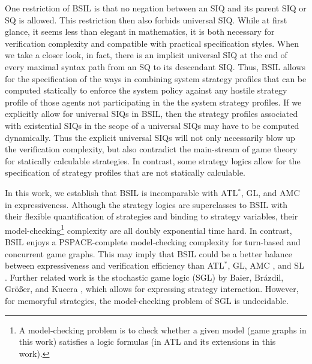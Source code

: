\documentclass[11pt]{article}
\begin{document}
\label{reply2.motive3} 
One restriction of BSIL is that no negation between an SIQ and its parent SIQ or SQ is allowed. 
This restriction then also forbids universal SIQ.  
While at first glance, it seems less than elegant in mathematics, 
it is both necessary for verification complexity and 
compatible with practical specification styles.  
When we take a closer look, in fact, there is an implicit universal SIQ 
at the end of every maximal syntax path from an SQ to its descendant SIQ.  
Thus, BSIL allows for the specification of the ways in combining system strategy profiles that 
can be computed statically to enforce the system policy against 
any hostile strategy profile of those agents not participating in the the system strategy 
profiles.  
If we explicitly allow for universal SIQs in BSIL, 
then the strategy profiles associated with existential SIQs in the scope of a universal SIQs 
may have to be computed dynamically.  
Thus the explicit universal SIQs will not only necessarily blow up the verification complexity, 
but also contradict the main-stream of game theory for statically calculable strategies.  
In contrast, some strategy logics \cite{MMV10} 
allow for the specification of strategy profiles that are not statically calculable.  

In this work, 
we establish that BSIL is incomparable with ATL$^*$, GL, and AMC 
in expressiveness.  
Although the strategy logics \cite{CHP10,CLM10,MMV10} are superclasses to BSIL  
with their flexible quantification of 
strategies and binding to strategy variables, 
their model-checking\footnote{A 
model-checking problem is to check whether a given model 
(game graphs in this work) satisfies a logic formulas 
(in ATL and its extensions in this work).}  
complexity are all doubly exponential time hard.  
In contrast, BSIL enjoys a PSPACE-complete model-checking complexity for 
turn-based and concurrent game graphs.  
This may imply that BSIL could be a better balance between 
expressiveness and verification efficiency 
than ATL$^*$, GL, AMC \cite{AHK02}, and SL \cite{CHP10,MMV10}.
Further related work is the stochastic game logic (SGL) by Baier, Br\'azdil,
Gr\"o{\ss}er, and Kucera \cite{BBGK07}, which allows for expressing strategy interaction.
However, for memoryful strategies, the model-checking problem of SGL is undecidable. 
\end{document}
